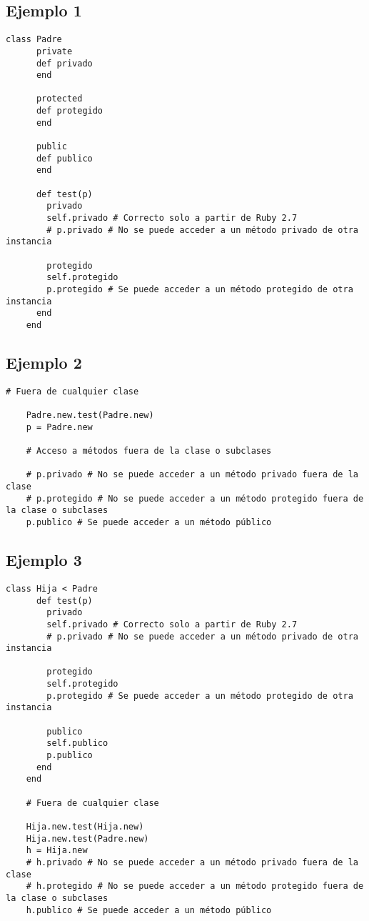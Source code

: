 \documentclass[a4paper,12pt]{article}
\begin{document}
\subsection{Ejemplo 1}
\begin{lstlisting}[style=customruby]
    class Padre
      private
      def privado
      end
    
      protected
      def protegido
      end
    
      public
      def publico
      end
    
      def test(p)
        privado
        self.privado # Correcto solo a partir de Ruby 2.7
        # p.privado # No se puede acceder a un método privado de otra instancia
    
        protegido
        self.protegido
        p.protegido # Se puede acceder a un método protegido de otra instancia
      end
    end
    \end{lstlisting}

\subsection{Ejemplo 2}
\begin{lstlisting}[style=customruby]
    # Fuera de cualquier clase
    
    Padre.new.test(Padre.new)
    p = Padre.new
    
    # Acceso a métodos fuera de la clase o subclases
    
    # p.privado # No se puede acceder a un método privado fuera de la clase
    # p.protegido # No se puede acceder a un método protegido fuera de la clase o subclases
    p.publico # Se puede acceder a un método público
    \end{lstlisting}

\subsection{Ejemplo 3}

\begin{lstlisting}[style=customruby]
    class Hija < Padre
      def test(p)
        privado
        self.privado # Correcto solo a partir de Ruby 2.7
        # p.privado # No se puede acceder a un método privado de otra instancia
    
        protegido
        self.protegido
        p.protegido # Se puede acceder a un método protegido de otra instancia
    
        publico
        self.publico
        p.publico
      end
    end
    
    # Fuera de cualquier clase
    
    Hija.new.test(Hija.new)
    Hija.new.test(Padre.new)
    h = Hija.new
    # h.privado # No se puede acceder a un método privado fuera de la clase
    # h.protegido # No se puede acceder a un método protegido fuera de la clase o subclases
    h.publico # Se puede acceder a un método público
    \end{lstlisting}
\end{document}
